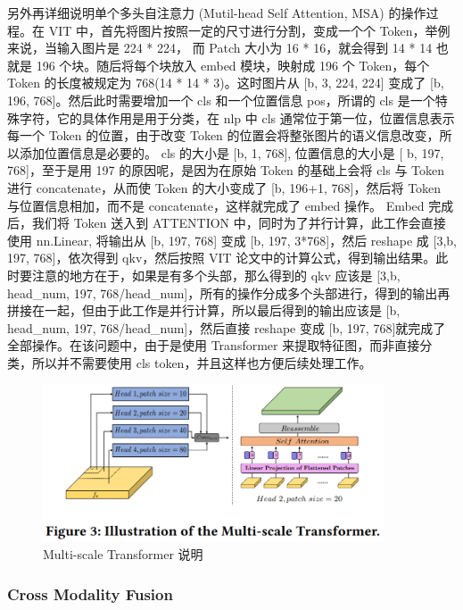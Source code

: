另外再详细说明单个多头自注意力 (Mutil-head Self Attention, MSA) 的操作过程。在 VIT 中，首先将图片按照一定的尺寸进行分割，变成一个个 Token，举例来说，当输入图片是 224 * 224， 而 Patch 大小为 16 * 16，就会得到 14 * 14 也就是 196 个块。随后将每个块放入 embed 模块，映射成 196 个 Token，每个 Token 的长度被规定为 768(14 * 14 * 3)。这时图片从 [b, 3, 224, 224] 变成了 [b, 196, 768]。然后此时需要增加一个 cls 和一个位置信息 pos，所谓的 cls 是一个特殊字符，它的具体作用是用于分类，在 nlp 中 cls 通常位于第一位，位置信息表示每一个 Token 的位置，由于改变 Token 的位置会将整张图片的语义信息改变，所以添加位置信息是必要的。 cls 的大小是 [b, 1, 768], 位置信息的大小是 [ b, 197, 768]，至于是用 197 的原因呢，是因为在原始 Token 的基础上会将 cls 与 Token 进行 concatenate，从而使 Token 的大小变成了 [b, 196+1, 768]，然后将 Token 与位置信息相加，而不是 concatenate，这样就完成了 embed 操作。 Embed 完成后，我们将 Token 送入到 ATTENTION 中，同时为了并行计算，此工作会直接使用 nn.Linear, 将输出从 [b, 197, 768] 变成 [b, 197, 3*768]，然后 reshape 成 [3,b, 197, 768]，依次得到 qkv，然后按照 VIT 论文中的计算公式，得到输出结果。此时要注意的地方在于，如果是有多个头部，那么得到的 qkv 应该是 [3,b, head\_num, 197, 768/head\_num]，所有的操作分成多个头部进行，得到的输出再拼接在一起，但由于此工作是并行计算，所以最后得到的输出应该是 [b, head\_num, 197, 768/head\_num]，然后直接 reshape 变成 [b, 197, 768]就完成了全部操作。在该问题中，由于是使用 Transformer 来提取特征图，而非直接分类，所以并不需要使用 cls token，并且这样也方便后续处理工作。

\begin{figure}[htb]
\centering 
\includegraphics[width=0.90\textwidth]{img/p1m3.png} 
\caption{Multi-scale Transformer 说明}
\label{Test}
\end{figure}

\subsubsection{Cross Modality Fusion}

